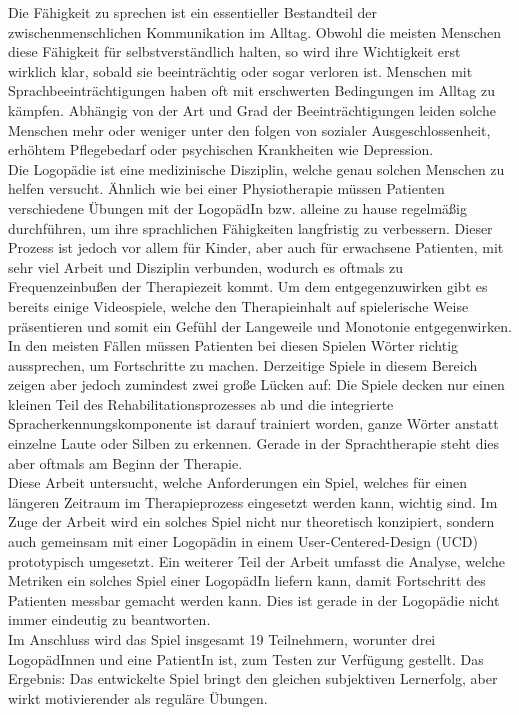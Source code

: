 \documentclass[draft,final]{vutinfth} %
\begin{document}
\begin{kurzfassung}
Die Fähigkeit zu sprechen ist ein essentieller Bestandteil der zwischenmenschlichen Kommunikation im Alltag. Obwohl die meisten Menschen diese Fähigkeit für selbstverständlich halten, so wird ihre Wichtigkeit erst wirklich klar, sobald sie beeinträchtig oder sogar verloren ist. Menschen mit Sprachbeeinträchtigungen haben oft mit erschwerten Bedingungen im Alltag zu kämpfen. Abhängig von der Art und Grad der Beeinträchtigungen leiden solche Menschen mehr oder weniger unter den folgen von sozialer Ausgeschlossenheit, erhöhtem Pflegebedarf oder psychischen Krankheiten wie Depression. \\
Die Logopädie ist eine medizinische Disziplin, welche genau solchen Menschen zu helfen versucht. Ähnlich wie bei einer Physiotherapie müssen Patienten verschiedene Übungen mit der LogopädIn bzw. alleine zu hause regelmäßig durchführen, um ihre sprachlichen Fähigkeiten langfristig zu verbessern. Dieser Prozess ist jedoch vor allem für Kinder, aber auch für erwachsene Patienten, mit sehr viel Arbeit und Disziplin verbunden, wodurch es oftmals zu Frequenzeinbußen der Therapiezeit kommt. Um dem entgegenzuwirken gibt es bereits einige Videospiele, welche den Therapieinhalt auf spielerische Weise präsentieren und somit ein Gefühl der Langeweile und Monotonie entgegenwirken. In den meisten Fällen müssen Patienten bei diesen Spielen Wörter richtig aussprechen, um Fortschritte zu machen. Derzeitige Spiele in diesem Bereich zeigen aber jedoch zumindest zwei große Lücken auf: Die Spiele decken nur einen kleinen Teil des Rehabilitationsprozesses ab und die integrierte  Spracherkennungskomponente ist darauf trainiert worden, ganze Wörter anstatt einzelne Laute oder Silben zu erkennen. Gerade in der Sprachtherapie steht dies aber oftmals am Beginn der Therapie.\\
Diese Arbeit untersucht, welche Anforderungen ein Spiel, welches für einen längeren Zeitraum im Therapieprozess eingesetzt werden kann, wichtig sind. Im Zuge der Arbeit wird ein solches Spiel nicht nur theoretisch konzipiert, sondern auch gemeinsam mit einer Logopädin in einem User-Centered-Design (UCD) prototypisch umgesetzt. Ein weiterer Teil der Arbeit umfasst die Analyse, welche Metriken ein solches Spiel einer LogopädIn liefern kann, damit Fortschritt des Patienten messbar gemacht werden kann. Dies ist gerade in der Logopädie nicht immer eindeutig zu beantworten. \\
Im Anschluss wird das Spiel insgesamt 19 Teilnehmern, worunter drei LogopädInnen und eine PatientIn ist, zum Testen zur Verfügung gestellt. Das Ergebnis: Das entwickelte Spiel bringt den gleichen subjektiven Lernerfolg, aber wirkt motivierender als reguläre Übungen. 
\end{kurzfassung}
\end{document}
